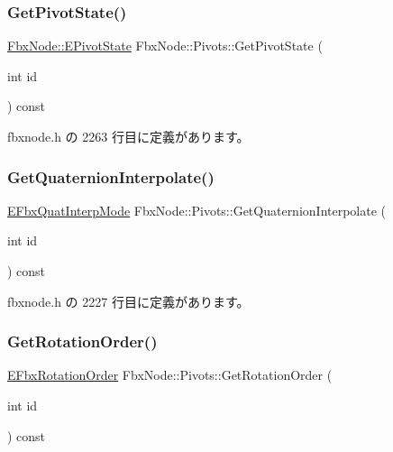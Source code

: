 \subsubsection{\texorpdfstring{Get\+Pivot\+State()}{GetPivotState()}}
{\footnotesize\ttfamily \hyperlink{class_fbx_node_a153fc75958227fc6728a2233b630b58a}{Fbx\+Node\+::\+E\+Pivot\+State} Fbx\+Node\+::\+Pivots\+::\+Get\+Pivot\+State (\begin{DoxyParamCaption}\item[{int}]{id }\end{DoxyParamCaption}) const\hspace{0.3cm}{\ttfamily [inline]}}



 fbxnode.\+h の 2263 行目に定義があります。

\mbox{\label{class_fbx_node_1_1_pivots_acc6e16a61e8411938939ac3a4dde3f33}} 
\subsubsection{\texorpdfstring{Get\+Quaternion\+Interpolate()}{GetQuaternionInterpolate()}}
{\footnotesize\ttfamily \hyperlink{fbxmath_8h_a9c7a0dfb52c83256d4a92c5c6d1be72a}{E\+Fbx\+Quat\+Interp\+Mode} Fbx\+Node\+::\+Pivots\+::\+Get\+Quaternion\+Interpolate (\begin{DoxyParamCaption}\item[{int}]{id }\end{DoxyParamCaption}) const\hspace{0.3cm}{\ttfamily [inline]}}



 fbxnode.\+h の 2227 行目に定義があります。

\mbox{\label{class_fbx_node_1_1_pivots_aab5f5f87a4eb865eeee4c232918677ef}} 
\subsubsection{\texorpdfstring{Get\+Rotation\+Order()}{GetRotationOrder()}}
{\footnotesize\ttfamily \hyperlink{fbxmath_8h_ae46778666b56bb0abe5992b855fe9332}{E\+Fbx\+Rotation\+Order} Fbx\+Node\+::\+Pivots\+::\+Get\+Rotation\+Order (\begin{DoxyParamCaption}\item[{int}]{id }\end{DoxyParamCaption}) const\hspace{0.3cm}{\ttfamily [inline]}}



